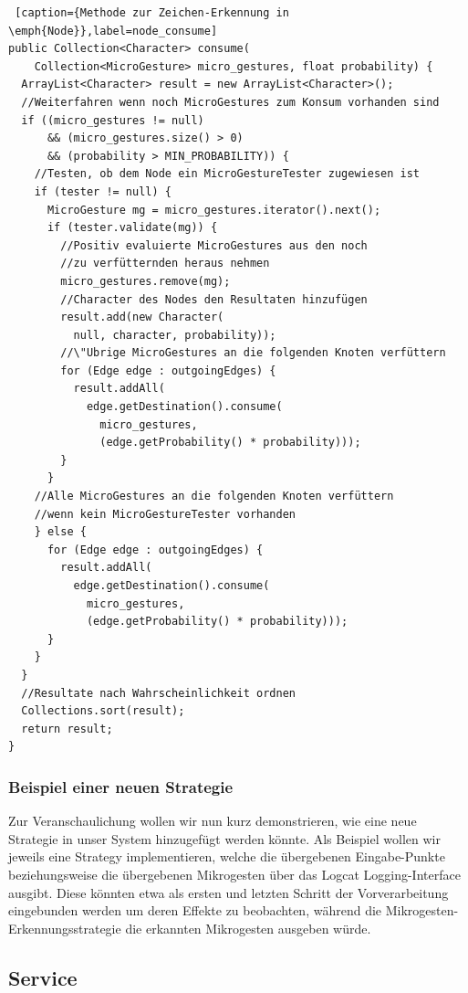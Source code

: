 \begin{lstlisting} [caption={Methode zur Zeichen-Erkennung in \emph{Node}},label=node_consume]
public Collection<Character> consume(
    Collection<MicroGesture> micro_gestures, float probability) {
  ArrayList<Character> result = new ArrayList<Character>();
  //Weiterfahren wenn noch MicroGestures zum Konsum vorhanden sind
  if ((micro_gestures != null) 
      && (micro_gestures.size() > 0) 
      && (probability > MIN_PROBABILITY)) {
    //Testen, ob dem Node ein MicroGestureTester zugewiesen ist
    if (tester != null) {
      MicroGesture mg = micro_gestures.iterator().next();
      if (tester.validate(mg)) {
        //Positiv evaluierte MicroGestures aus den noch 
        //zu verfütternden heraus nehmen
        micro_gestures.remove(mg);
        //Character des Nodes den Resultaten hinzufügen
        result.add(new Character(
          null, character, probability));
        //\"Ubrige MicroGestures an die folgenden Knoten verfüttern
        for (Edge edge : outgoingEdges) {
          result.addAll(
            edge.getDestination().consume(
              micro_gestures, 
              (edge.getProbability() * probability)));
        }
      }
    //Alle MicroGestures an die folgenden Knoten verfüttern 
    //wenn kein MicroGestureTester vorhanden
    } else {
      for (Edge edge : outgoingEdges) {
        result.addAll(
          edge.getDestination().consume(
            micro_gestures, 
            (edge.getProbability() * probability)));
      }
    }
  }
  //Resultate nach Wahrscheinlichkeit ordnen
  Collections.sort(result);
  return result;
}
\end{lstlisting}


\subsubsection{Beispiel einer neuen Strategie}

Zur Veranschaulichung wollen wir nun kurz demonstrieren, wie eine neue Strategie in unser System hinzugefügt werden könnte. Als Beispiel wollen wir jeweils eine Strategy implementieren, welche die übergebenen Eingabe-Punkte beziehungsweise die übergebenen Mikrogesten über das Logcat Logging-Interface ausgibt. Diese könnten etwa als ersten und letzten Schritt der Vorverarbeitung eingebunden werden um deren Effekte zu beobachten, während die Mikrogesten-Erkennungsstrategie die erkannten Mikrogesten ausgeben würde.


\subsection{Service}\label{lbl_be_impl_service}


